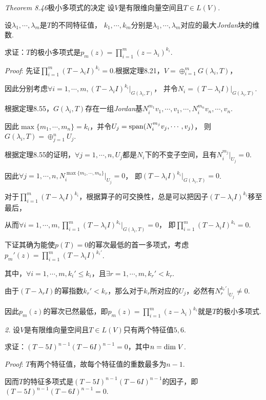 \textit{Theorem 8.46}{\kaishu 极小多项式的决定}
设$V$是有限维向量空间且$T \in L(V)$.

设$\lambda_1,\cdots,\lambda_m$是$T$的不同特征值，
$k_1,\cdots,k_m$分别是$\lambda_1,\cdots,\lambda_m$对应的最大\textit{Jordan}块的维数.

求证：$T$的极小多项式是$p_m(z)=\prod_{i=1}^m (z-\lambda_i)^{k_i}$.

\textit{Proof}:
先证$\prod_{i=1}^m (T-\lambda_i I)^{k_i}=0$.根据定理8.21，$V=\oplus_{i=1}^m G(\lambda_i,T)$，

因此分别考虑$\forall i=1,\cdots,m,(T-\lambda_i I)^{k_i}|_{G(\lambda_i,T)}$，
并令$N_i=(T-\lambda_i I)|_{G(\lambda_i,T)}$.

根据定理8.55，$G(\lambda_i,T)$存在一组\textit{Jordan}基$N_i^{m_1}v_1,\cdots,v_1,\cdots,N_i^{m_n}v_n,\cdots,v_n$.

因此$\max \{m_1,\cdots,m_n\}=k_i$，并令$U_j=\mathrm{span} (N_i^{m_j}v_j,\cdots,v_j)$，
则$G(\lambda_i,T)=\oplus_{j=1}^n U_j$.

根据定理8.55的证明，$\forall j=1,\cdots,n,U_j$都是$N_i$下的不变子空间，且有$N_i^{m_j}|_{U_j}=0$.

因此$\forall j=1,\cdots,n,N_i^{\max \{m_1,\cdots,m_n\}}|_{U_j}=0$，
即$(T-\lambda_i I)^{k_i}|_{G(\lambda_i,T)}=0$.

对于$\prod_{i=1}^m (T-\lambda_i I)^{k_i}$，根据算子的可交换性，总是可以把因子$(T-\lambda_i I)^{k_i}$移至最后，

从而$\forall i=1,\cdots,m,\prod_{i=1}^m (T-\lambda_i I)^{k_i}|_{G(\lambda_i,T)}=0$，
即$\prod_{i=1}^m (T-\lambda_i I)^{k_i}=0$.

下证其确为能使$p(T)=0$的幂次最低的首一多项式，考虑$p_m'(z)=\prod_{i=1}^m (T-\lambda_i I)^{k_i'}$.

其中，$\forall i=1,\cdots,m,k_i' \leq k_i$，且$\exists r=1,\cdots,m,k_r'<k_r$.

由于$(T-\lambda_r I)$的幂指数$k_r'<k_r$，那么对于$k_r$所对应的$U_j$，必然有$N_r^{k_r'}|_{U_j} \ne 0$.

因此$p_m(z)$的幂次已然最低，即$p_m(z)=\prod_{i=1}^m (z-\lambda_i)^{k_i}$就是$T$的极小多项式.

\hspace*{\fill}

\textit{2.}
设$V$是有限维向量空间且$T \in L(V)$只有两个特征值$5,6$.

求证：$(T-5I)^{n-1}(T-6I)^{n-1}=0$，其中$n=\mathrm{dim \;} V$.

\textit{Proof}:
$T$有两个特征值，故每个特征值的重数最多为$n-1$.

因而$T$的特征多项式是$(T-5I)^{n-1}(T-6I)^{n-1}$的因子，即$(T-5I)^{n-1}(T-6I)^{n-1}=0$.

